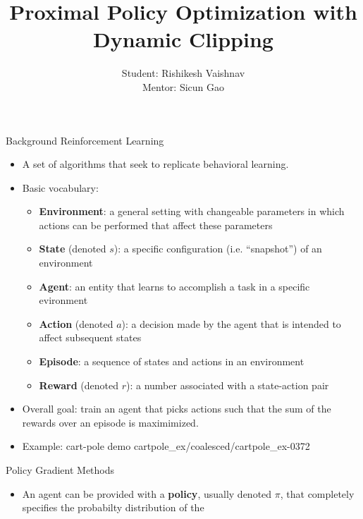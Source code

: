 \documentclass{beamer}
\title{Proximal Policy Optimization with Dynamic Clipping}
\author{Student: Rishikesh Vaishnav\\Mentor: Sicun Gao}
\begin{document}
\captionsetup{labelformat=empty, font=footnotesize}
\renewcommand{\thealgorithm}{}
\maketitle
\begin{frame}{Background}
    Reinforcement Learning
    \begin{itemize}
        \item A set of algorithms that seek to replicate behavioral learning.
        \item Basic vocabulary:
        \begin{itemize}
            \item \textbf{Environment}: a general setting with changeable
                parameters in which actions can be performed that affect these
                parameters
            \item \textbf{State} (denoted $s$): a specific configuration (i.e. ``snapshot'')
                of an environment
            \item \textbf{Agent}: an entity that learns to accomplish a task in
                a specific evironment
            \item \textbf{Action} (denoted $a$): a decision made by the agent that is intended
                to affect subsequent states
            \item \textbf{Episode}: a sequence of states and actions in an
                environment
            \item \textbf{Reward} (denoted $r$): a number associated with a state-action pair
        \end{itemize}
        \item Overall goal: train an agent that picks actions such that the sum
            of the rewards over an episode is maximimized.
        \framebreak
        \item Example: cart-pole demo
                {cartpole_ex/coalesced/cartpole_ex-}{0}{372}
    \end{itemize}
    \framebreak
    Policy Gradient Methods
    \begin{itemize}
        \item An agent can be provided with a \textbf{policy}, usually denoted
            $\pi$, that completely specifies the probabilty distribution of the

\end{itemize}
\end{frame}
\end{document}
